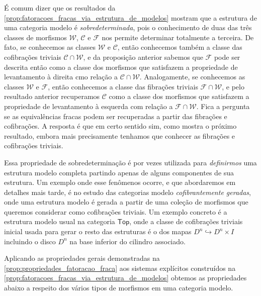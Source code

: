 \begin{obs}
  É comum dizer que os resultados da \cref{prop:fatoracoes_fracas_via_estrutura_de_modelos} mostram que a estrutura de uma categoria modelo é \emph{sobredeterminada}, pois o conhecimento de duas das três classes de morfismos $\mathcal{W}$, $\mathcal{C}$ e $\mathcal{F}$ nos permite determinar totalmente a terceira.
  De fato, se conhecemos as classes $\mathcal{W}$ e $\mathcal{C}$, então conhecemos também a classe das cofibrações triviais $\mathcal{C} \cap \mathcal{W}$, e da proposição anterior sabemos que $\mathcal{F}$ pode ser descrita então como a classe dos morfismos que satisfazem a propriedade de levantamento à direita cmo relação a $\mathcal{C} \cap \mathcal{W}$.
  Analogamente, se conhecemos as classes $\mathcal{W}$ e $\mathcal{F}$, então conhecemos a classe das fibrações triviais $\mathcal{F} \cap \mathcal{W}$, e pelo resultado anterior recuperamos $\mathcal{C}$ como a classe dos morfismos que satisfazem a propriedade de levantamento à esquerda com relação a $\mathcal{F} \cap \mathcal{W}$.
  Fica a pergunta se as equivalências fracas podem ser recuperadas a partir das fibrações e cofibrações.
  A resposta é que em certo sentido sim, como mostra o próximo resultado, embora mais precisamente tenhamos que conhecer as fibrações e cofibrações triviais.

  Essa propriedade de sobredeterminação é por vezes utilizada para \emph{definirmos} uma estrutura modelo completa partindo apenas de alguns componentes de sua estrutura.
  Um exemplo onde esse fenômenos ocorre, e que abordaremos em detalhes mais tarde, é no estudo das categorias modelo \emph{cofibrantemente geradas}, onde uma estrutura modelo é gerada a partir de uma coleção de morfismos que queremos considerar como cofibrações triviais.
  Um exemplo concreto é a estrutura modelo usual na categoria $\mathsf{Top}$, onde a classe de cofibrações triviais inicial usada para gerar o resto das estruturas é o dos mapas $D^{n} \hookrightarrow D^{n} \times I$ incluindo o disco $D^{n}$ na base inferior do cilindro associado.
\end{obs}

Aplicando as propriedades gerais demonstradas na \cref{prop:propriedades_fatoracao_fraca} aos sistemas explícitos construídos na \cref{prop:fatoracoes_fracas_via_estrutura_de_modelos} obtemos as propriedades abaixo a respeito dos vários tipos de morfismos em uma categoria modelo.

